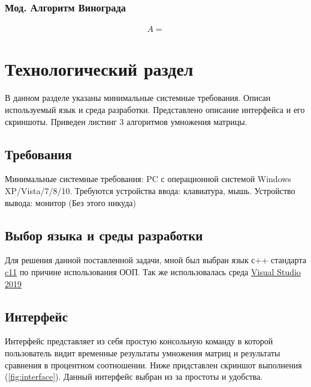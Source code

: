\documentclass[a4paper, 14pt]{article}
\begin{document}
	\subsubsection{Мод. Алгоритм Винограда}
	
	\begin{equation}
	\boxed{\begin{aligned}
		A = 
		\end{aligned}}
	\end{equation}
	
	
	
	\newpage
	\section{Технологический раздел}
	
	В данном разделе указаны минимальные системные требования. Описан используемый язык и среда разработки.
	Представлено описание интерфейса и его скриншоты. Приведен листинг 3 алгоритмов умножения матрицы.
	
	\subsection{Требования}
	
	Минимальные системные требования: PC с операционной системой Windows XP/Vista/7/8/10. Требуются устройства ввода: клавиатура, мышь. Устройство вывода: монитор (Без этого никуда)
	
	\subsection{Выбор языка и среды разработки}
	
	Для решения данной поставленной задачи, мной был выбран язык с++ стандарта \href{http://www.open-std.org/jtc1/sc22/wg14/www/docs/n1548.pdf}{c11} по причине использования ООП. Так же использовалась среда \href{https://visualstudio.microsoft.com/ru/vs/}{Visual Studio 2019}
	
	\subsection{Интерфейс}
	
	Интерфейс представляет из себя простую консольную команду в которой пользователь видит временные результаты умножения матриц и результаты сравнения в процентном соотношении. Ниже придставлен скриншот выполнения (\ref{fig:interface}). Данный интерфейс выбран из за простоты и удобства.
	
\end{document}
